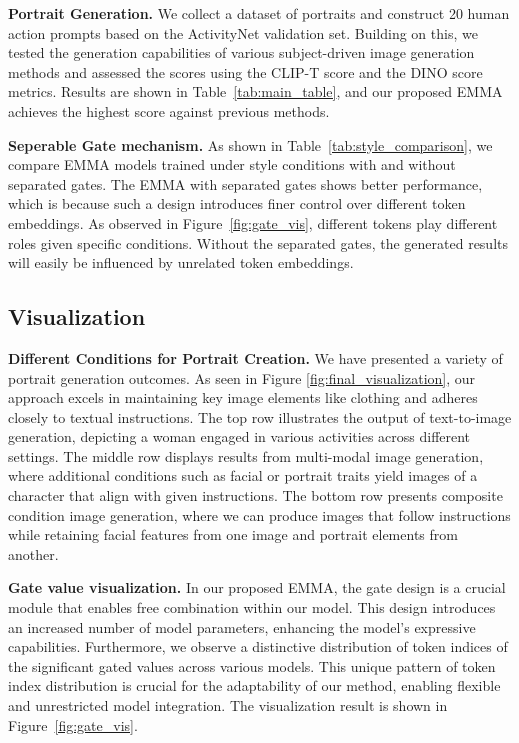 \textbf{Portrait Generation.} We collect a dataset of portraits and construct 20 human action prompts based on the ActivityNet validation set. Building on this, we tested the generation capabilities of various subject-driven image generation methods and assessed the scores using the CLIP-T score and the DINO score metrics. Results are shown in Table~\ref{tab:main_table}, and our proposed EMMA achieves the highest score against previous methods. 

\textbf{Seperable Gate mechanism.} As shown in Table~\ref{tab:style_comparison}, we compare EMMA models trained under style conditions with and without separated gates. The EMMA with separated gates shows better performance, which is because such a design introduces finer control over different token embeddings. As observed in Figure~\ref{fig:gate_vis}, different tokens play different roles given specific conditions. Without the separated gates, the generated results will easily be influenced by unrelated token embeddings. 

\subsection{Visualization} 
\textbf{Different Conditions for Portrait Creation.} We have presented a variety of portrait generation outcomes. As seen in Figure \ref{fig:final_visualization}, our approach excels in maintaining key image elements like clothing and adheres closely to textual instructions. The top row illustrates the output of text-to-image generation, depicting a woman engaged in various activities across different settings. The middle row displays results from multi-modal image generation, where additional conditions such as facial or portrait traits yield images of a character that align with given instructions. The bottom row presents composite condition image generation, where we can produce images that follow instructions while retaining facial features from one image and portrait elements from another.


\textbf{Gate value visualization.} 
In our proposed EMMA, the gate design is a crucial module that enables free combination within our model. This design introduces an increased number of model parameters, enhancing the model's expressive capabilities. Furthermore, we observe a distinctive distribution of token indices of the significant gated values across various models. This unique pattern of token index distribution is crucial for the adaptability of our method, enabling flexible and unrestricted model integration. The visualization result is shown in Figure~\ref{fig:gate_vis}. 




